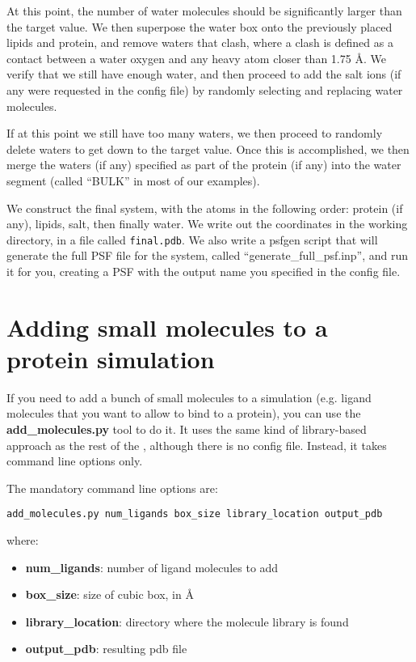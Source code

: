 \documentclass[12pt]{article}
\begin{document}
At this point, the number of water molecules should be significantly larger
than the target value.  We then superpose the water box onto the previously
placed lipids and protein, and remove waters that clash, where a clash is
defined as a contact between a water oxygen and any heavy atom closer than 1.75
{\AA}.  We verify that we still have enough water, and then proceed to add
the salt ions (if any were requested in the config file) by randomly
selecting and replacing water molecules.

If at this point we still have too many waters, we then proceed to randomly
delete waters to get down to the target value.  Once this is accomplished, we
then merge the waters (if any) specified as part of the protein (if any) into
the water segment (called ``BULK'' in most of our examples).

We construct the final system, with the atoms in the following order: protein
(if any), lipids, salt, then finally water.  We write out the coordinates in
the working directory, in a file called {\tt final.pdb}.  We also write a
psfgen script that will generate the full PSF file for the system, called
``generate\_full\_psf.inp'', and run it for you, creating a PSF with the
output name you specified in the config file.

\section{Adding small molecules to a protein simulation}

If you need to add a bunch of small molecules to a simulation (e.g. ligand
molecules that you want to allow to bind to a protein), you can use the {\bf
add\_molecules.py} tool to do it.  It uses the same kind of library-based
approach as the rest of the {\omgwtf}, although there is no config file.
Instead, it takes command line options only.

The mandatory command line options are:

{\tt add\_molecules.py num\_ligands box\_size library\_location output\_pdb}

where:
\begin{itemize}
    \item {\bf num\_ligands}: number of ligand molecules to add
    \item {\bf box\_size}: size of cubic box, in {\AA}
    \item {\bf library\_location}: directory where the molecule library is found
    \item {\bf output\_pdb}: resulting pdb file
\end{itemize}
\end{document}
